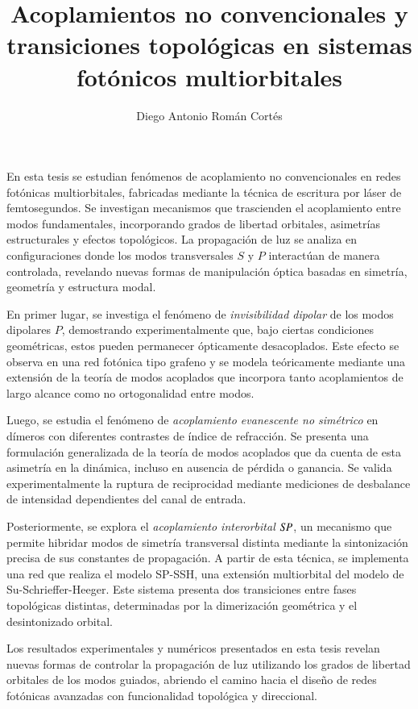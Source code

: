 \documentclass[hyphens]{umemoria}
\author{Diego Antonio Román Cortés}
\title{Acoplamientos no convencionales y transiciones topológicas en sistemas fotónicos multiorbitales}
\begin{document}
\frontmatter
\maketitle

\begin{resumen}\ignorespacesafterend
	En esta tesis se estudian fenómenos de acoplamiento no convencionales en redes fotónicas multiorbitales, fabricadas mediante la técnica de escritura por láser de femtosegundos. Se investigan mecanismos que trascienden el acoplamiento entre modos fundamentales, incorporando grados de libertad orbitales, asimetrías estructurales y efectos topológicos. La propagación de luz se analiza en configuraciones donde los modos transversales \( S \) y \( P \) interactúan de manera controlada, revelando nuevas formas de manipulación óptica basadas en simetría, geometría y estructura modal.
	
	En primer lugar, se investiga el fenómeno de \textit{invisibilidad dipolar} de los modos dipolares \( P \), demostrando experimentalmente que, bajo ciertas condiciones geométricas, estos pueden permanecer ópticamente desacoplados. Este efecto se observa en una red fotónica tipo grafeno  y se modela teóricamente mediante una extensión de la teoría de modos acoplados que incorpora tanto acoplamientos de largo alcance como no ortogonalidad entre modos.
	
	Luego, se estudia el fenómeno de \textit{acoplamiento evanescente no simétrico} en dímeros con diferentes contrastes de índice de refracción. Se presenta una formulación generalizada de la teoría de modos acoplados que da cuenta de esta asimetría en la dinámica, incluso en ausencia de pérdida o ganancia. Se valida experimentalmente la ruptura de reciprocidad mediante mediciones de desbalance de intensidad dependientes del canal de entrada.
	
	Posteriormente, se explora el \textit{acoplamiento interorbital \( S\hspace{-0.3ex}P \)}, un mecanismo que permite hibridar modos de simetría transversal distinta mediante la sintonización precisa de sus constantes de propagación. A partir de esta técnica, se implementa una red que realiza el modelo SP-SSH, una extensión multiorbital del modelo de Su-Schrieffer-Heeger. Este sistema presenta dos transiciones entre fases topológicas distintas, determinadas por la dimerización geométrica y el desintonizado orbital.
	
	Los resultados experimentales y numéricos presentados en esta tesis revelan nuevas formas de controlar la propagación de luz utilizando los grados de libertad orbitales de los modos guiados, abriendo el camino hacia el diseño de redes fotónicas avanzadas con funcionalidad topológica y direccional.
\end{resumen}
\end{document}
